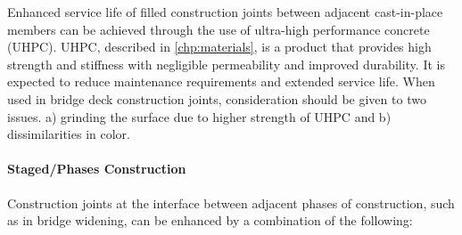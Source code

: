 Enhanced service life of filled construction joints between adjacent cast-in-place members can be achieved through the use of ultra-high performance concrete (UHPC). UHPC, described in \cref{chp:materials}, is a product that provides high strength and stiffness with negligible permeability and improved durability. It is expected to reduce maintenance requirements and extended service life. When used in bridge deck construction joints, consideration should be given to two issues. a) grinding the surface due to higher strength of UHPC and b) dissimilarities in color.

\paragraph{Staged/Phases Construction}
Construction joints at the interface between adjacent phases of construction, such as in bridge widening, can be enhanced by a combination of the following:

